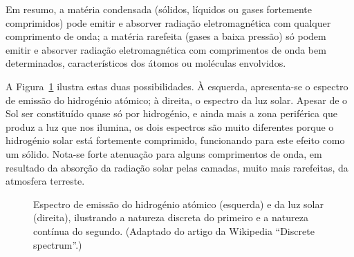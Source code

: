 Em resumo, a matéria condensada (sólidos, líquidos ou gases fortemente
comprimidos) pode emitir e absorver radiação eletromagnética com qualquer
comprimento de onda; a matéria rarefeita (gases a baixa pressão) só podem emitir
e absorver radiação eletromagnética com comprimentos de onda bem determinados,
característicos dos átomos ou moléculas envolvidos.

A Figura~\ref{fig:spectrums} ilustra estas duas possibilidades. À esquerda,
apresenta-se o espectro de emissão do hidrogénio atómico; à direita, o espectro
da luz solar. Apesar de o Sol ser constituído quase só por hidrogénio, e ainda
mais a zona periférica que produz a luz que nos ilumina, os dois
espectros são muito diferentes porque o hidrogénio solar está fortemente
comprimido, funcionando para este efeito como um sólido. Nota-se forte atenuação
para alguns comprimentos de onda, em resultado da absorção da radiação solar
pelas camadas, muito mais rarefeitas, da atmosfera terreste.
\begin{figure}[htb]
{\centering
    \hfill
}\par
\caption{Espectro de emissão do hidrogénio atómico (esquerda) e da luz solar
(direita), ilustrando a natureza discreta do primeiro e a natureza contínua do
segundo. (Adaptado do artigo da Wikipedia ``Discrete spectrum''.)
\label{fig:spectrums}}
\end{figure}

\newpage

